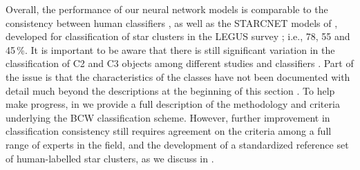 \documentclass[linenumbers]{aastex63}
\begin{document}
Overall, the performance of our neural network models is comparable to the consistency between human classifiers \citep{wei_deep_2020, whitmore_star_2021}, as well as the \textsc{STARCNET} models of \citet{perez_starcnet_2021}, developed for classification of star clusters in the LEGUS survey \citep{calzetti_legacy_2015, linden_star_2022}; i.e., 78, 55 and 45\,\%.  It is important to be aware that there is still significant variation in the classification of C2 and C3 objects among different studies and classifiers \citep[e.g., discussion in section 6.3.3 of][]{whitmore_star_2021}.  Part of the issue is that the characteristics of the classes have not been documented with detail much beyond the descriptions at the beginning of this section \citep[e.g., see section 2 in both][]{adamo_legacy_2017, perez_starcnet_2021}.  To help make progress, in \citet{whitmore_star_2021} we provide a full description of the methodology and criteria underlying the BCW classification scheme.  However, further improvement in classification consistency still requires agreement on the criteria among a full range of experts in the field, and the development of a standardized reference set of human-labelled star clusters, as we discuss in \citet{wei_deep_2020}.  


\end{document}
